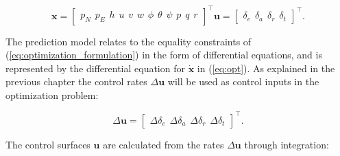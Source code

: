 \begin{subequations}
\begin{equation}
	\label{eq:uav_states}
	\mathbf{x} =
	\begin{bmatrix}
		p_N \hspace{5pt} p_E \hspace{5pt} h \hspace{5pt}
		u \hspace{5pt} v \hspace{5pt} w \hspace{5pt}
		\phi \hspace{5pt} \theta \hspace{5pt} \psi \hspace{5pt}
		p \hspace{5pt} q \hspace{5pt} r
	\end{bmatrix}^\intercal
\end{equation}
\begin{equation}
	\mathbf{u} =
	\begin{bmatrix}
		\delta_e \hspace{5pt} \delta_a \hspace{5pt} \delta_r \hspace{5pt} \delta_t
	\end{bmatrix}^\intercal.
\end{equation}
\end{subequations}

The prediction model relates to the equality constraints of (\ref{eq:optimization_formulation}) in the form of differential equations, and is represented by the differential equation for $\mathbf{\dot{x}}$ in (\ref{eq:opt}). As explained in the previous chapter the control rates $\Delta \mathbf{u}$ will be used as control inputs in the optimization problem:

\begin{equation}
	\label{eq:control_rates}
	\Delta\mathbf{u} = 
	\begin{bmatrix}
		\Delta\delta_e \hspace{5pt} \Delta\delta_a \hspace{5pt} \Delta\delta_r \hspace{5pt} \Delta\delta_t
	\end{bmatrix} ^\intercal .
\end{equation}

The control surfaces $\mathbf{u}$ are calculated from the rates $\Delta\mathbf{u}$ through integration:

